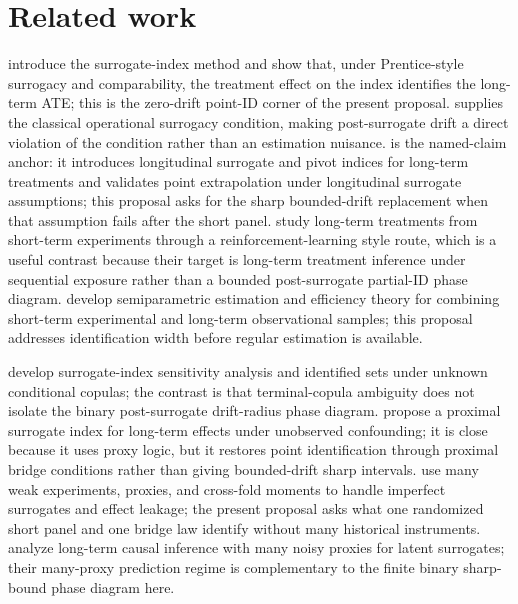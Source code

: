 \documentclass[11pt]{article}
\theoremstyle{definition}
\theoremstyle{plain}
\theoremstyle{remark}
\begin{document}
\section{Related work}
\citet{AtheyChettyImbensKang2019} introduce the surrogate-index method and show that, under Prentice-style surrogacy and comparability, the treatment effect on the index identifies the long-term ATE; this is the zero-drift point-ID corner of the present proposal.  \citet{Prentice1989} supplies the classical operational surrogacy condition, making post-surrogate drift a direct violation of the condition rather than an estimation nuisance.  \citet{HuangWangYuanZhaoZhang2026} is the named-claim anchor: it introduces longitudinal surrogate and pivot indices for long-term treatments and validates point extrapolation under longitudinal surrogate assumptions; this proposal asks for the sharp bounded-drift replacement when that assumption fails after the short panel.  \citet{TranBibautKallus2024} study long-term treatments from short-term experiments through a reinforcement-learning style route, which is a useful contrast because their target is long-term treatment inference under sequential exposure rather than a bounded post-surrogate partial-ID phase diagram.  \citet{ChenRitzwoller2023} develop semiparametric estimation and efficiency theory for combining short-term experimental and long-term observational samples; this proposal addresses identification width before regular estimation is available.

\citet{FanManzanaresParkQi2026} develop surrogate-index sensitivity analysis and identified sets under unknown conditional copulas; the contrast is that terminal-copula ambiguity does not isolate the binary post-surrogate drift-radius phase diagram.  \citet{HungChen2026} propose a proximal surrogate index for long-term effects under unobserved confounding; it is close because it uses proxy logic, but it restores point identification through proximal bridge conditions rather than giving bounded-drift sharp intervals.  \citet{BibautKallusEjdemyrZhao2023} use many weak experiments, proxies, and cross-fold moments to handle imperfect surrogates and effect leakage; the present proposal asks what one randomized short panel and one bridge law identify without many historical instruments.  \citet{LalImbensHull2026} analyze long-term causal inference with many noisy proxies for latent surrogates; their many-proxy prediction regime is complementary to the finite binary sharp-bound phase diagram here.
\end{document}
